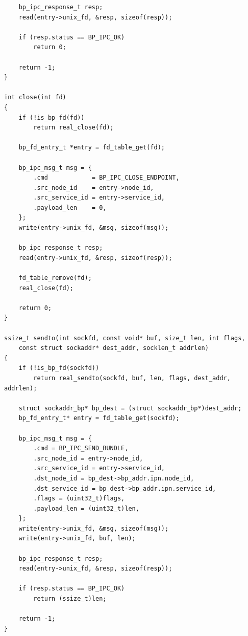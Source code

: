 \documentclass{article}
\begin{document}
\begin{verbatim}
    bp_ipc_response_t resp;
    read(entry->unix_fd, &resp, sizeof(resp));

    if (resp.status == BP_IPC_OK)
        return 0;

    return -1;
}

int close(int fd)
{
    if (!is_bp_fd(fd))
        return real_close(fd);

    bp_fd_entry_t *entry = fd_table_get(fd);

    bp_ipc_msg_t msg = {
        .cmd            = BP_IPC_CLOSE_ENDPOINT,
        .src_node_id    = entry->node_id,
        .src_service_id = entry->service_id,
        .payload_len    = 0,
    };
    write(entry->unix_fd, &msg, sizeof(msg));

    bp_ipc_response_t resp;
    read(entry->unix_fd, &resp, sizeof(resp));

    fd_table_remove(fd);
    real_close(fd);

    return 0;
}

ssize_t sendto(int sockfd, const void* buf, size_t len, int flags,
    const struct sockaddr* dest_addr, socklen_t addrlen)
{
	if (!is_bp_fd(sockfd))
		return real_sendto(sockfd, buf, len, flags, dest_addr, addrlen);

	struct sockaddr_bp* bp_dest = (struct sockaddr_bp*)dest_addr;
	bp_fd_entry_t* entry = fd_table_get(sockfd);

	bp_ipc_msg_t msg = {
		.cmd = BP_IPC_SEND_BUNDLE,
		.src_node_id = entry->node_id,
		.src_service_id = entry->service_id,
		.dst_node_id = bp_dest->bp_addr.ipn.node_id,
		.dst_service_id = bp_dest->bp_addr.ipn.service_id,
		.flags = (uint32_t)flags,
		.payload_len = (uint32_t)len,
	};
	write(entry->unix_fd, &msg, sizeof(msg));
	write(entry->unix_fd, buf, len);

	bp_ipc_response_t resp;
	read(entry->unix_fd, &resp, sizeof(resp));

	if (resp.status == BP_IPC_OK)
		return (ssize_t)len;

	return -1;
}
\end{verbatim}
\end{document}

